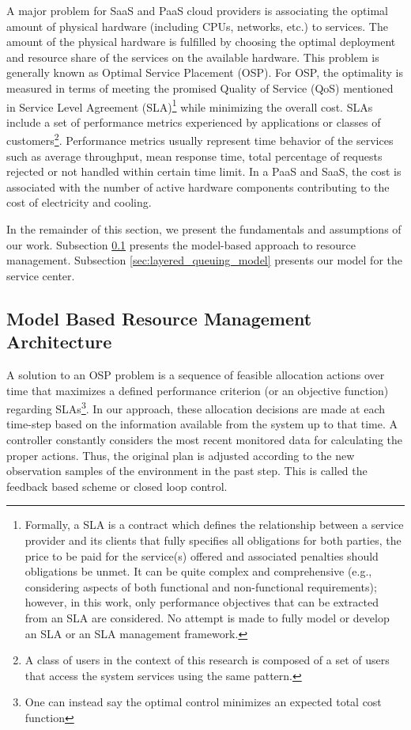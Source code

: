 \documentclass[11pt]{article}
\begin{document}
  A major problem for SaaS and PaaS cloud providers is associating the optimal amount of physical hardware (including CPUs, networks, etc.) to services. 
  The amount of the physical hardware is fulfilled by choosing the optimal deployment and resource share of the services on the available hardware.
	This problem is generally known as Optimal Service Placement (OSP)\cite{zhang2012dynamicPlacement}. 
   For OSP, the optimality is measured in terms of meeting the promised Quality of Service (QoS) mentioned in Service Level Agreement (SLA)\footnote{Formally, a SLA is a contract which defines the relationship between a service provider and its clients that fully specifies all obligations for both parties, the price to be paid for the service(s) offered and associated penalties should obligations be unmet. It can be quite complex and comprehensive (e.g., considering aspects of both functional and non-functional requirements); however, in this work, only performance objectives that can be extracted from an SLA are considered. No attempt is made to fully model or develop an SLA or an SLA management framework.} while minimizing the overall cost. SLAs include a set of performance metrics experienced by applications or classes of customers\footnote{A class of users in the context of this research is composed of a set of users that access the system services using the same pattern.}.
	Performance metrics usually represent time behavior of the services such as average throughput, mean response time, total percentage of requests rejected or not handled within certain time limit. 
	In a PaaS and SaaS, the cost is associated with the number of active hardware components contributing to the cost of electricity and cooling. 

In the remainder of this section, we present the fundamentals and assumptions of our work. Subsection \ref{sec:model_based_resource_management_architecture} presents the model-based approach to resource management. Subsection \ref{sec:layered_queuing_model} presents our model for the service center.
 
\subsection{Model Based Resource Management Architecture}  
\label{sec:model_based_resource_management_architecture}
  A solution to an OSP problem is a sequence of feasible allocation actions over time that maximizes a defined performance criterion (or an objective function) regarding SLAs\footnote{One can instead say the optimal control minimizes an expected total cost function}.
In our approach, these allocation decisions are made at each time-step based on the information available from the system up to that time.
 A controller constantly considers the most recent monitored data for calculating the proper actions. Thus, the original plan is adjusted according to the new observation samples of the environment in the past step. This is called the feedback based scheme or closed loop control.
\end{document}

